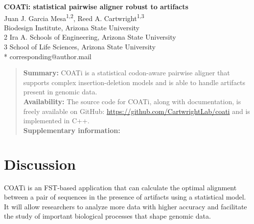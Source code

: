 



\begin{flushleft}
{\Large\textbf{COATi: statistical pairwise aligner robust to artifacts}}
\newline
\\
Juan J. Garcia Mesa\textsuperscript{1,2},
Reed A. Cartwright\textsuperscript{1,3}
\\
 Biodesign Institute, Arizona State University
\\
2 Ira A. Schools of Engineering, Arizona State University
\\
3 School of Life Sciences, Arizona State University
\\
\bigskip
* corresponding@author.mail

\end{flushleft}

\begin{abstract}
\noindent \textbf{Summary:} COATi is a statistical codon-aware pairwise aligner
that supports complex insertion-deletion models and is able to handle artifacts
present in genomic data.\\  %
\textbf{Availability:} The source code for COATi, along with documentation, is
freely available on GitHub: \url{https://github.com/CartwrightLab/coati} and is
implemented in C++.\\
\textbf{Supplementary information:} %
\end{abstract}


\linenumbers







\section{Discussion}

COATi is an FST-based application that can calculate the optimal alignment
between a pair of sequences in the presence of artifacts using a statistical
model.
It will allow researchers to analyze more data with higher accuracy and
facilitate the study of important biological processes that shape genomic data.

